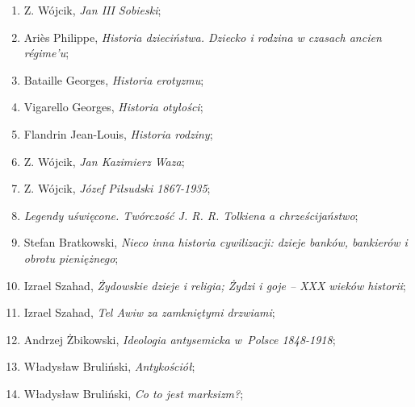 \documentclass[a4paper,11pt]{article}
\begin{document}
\begin{enumerate}
\item Z. Wójcik, \textit{Jan III Sobieski};



\item Ariès Philippe, \textit{Historia dzieciństwa. Dziecko i rodzina w
    czasach ancien régime’u};



\item Bataille Georges, \textit{Historia erotyzmu};



\item Vigarello Georges, \textit{Historia otyłości};



\item Flandrin Jean-Louis, \textit{Historia rodziny};



\item Z. Wójcik, \textit{Jan Kazimierz Waza};



\item Z. Wójcik, \textit{Józef Piłsudski 1867-1935};



\item \textit{Legendy uświęcone. Twórczość J. R. R. Tolkiena a
    chrześcijaństwo};



\item Stefan Bratkowski, \textit{Nieco inna historia cywilizacji: dzieje
    banków, bankierów i obrotu pieniężnego};



\item Izrael Szahad, \textit{Żydowskie dzieje i religia; Żydzi i goje –
    XXX wieków historii};



\item Izrael Szahad, \textit{Tel Awiw za zamkniętymi drzwiami};



\item Andrzej Żbikowski, \textit{Ideologia antysemicka w~Polsce
    1848-1918};



\item Władysław Bruliński, \textit{Antykościół};



\item Władysław Bruliński, \textit{Co to jest marksizm?};




\end{enumerate}
\end{document}
